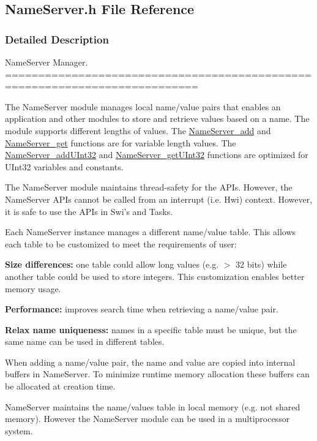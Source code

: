 \subsection{NameServer.h File Reference}
\label{_name_server_8h}


\subsubsection{Detailed Description}
NameServer Manager. ===========================================================================

The NameServer module manages local name/value pairs that enables an application and other modules to store and retrieve values based on a name. The module supports different lengths of values. The \hyperlink{_name_server_8h_ad7d45ed8fe5bcd1f10da5914c8da39f5}{NameServer\_\-add} and \hyperlink{_name_server_8h_a5f1013e57e7c5da9f003063d70a76e01}{NameServer\_\-get} functions are for variable length values. The \hyperlink{_name_server_8h_ac130195a04a34dfa2daba6ec3fff65d6}{NameServer\_\-addUInt32} and \hyperlink{_name_server_8h_ac3b6fa4f8f0ed572f1a5f6b7cb05679e}{NameServer\_\-getUInt32} functions are optimized for UInt32 variables and constants.

The NameServer module maintains thread-\/safety for the APIs. However, the NameServer APIs cannot be called from an interrupt (i.e. Hwi) context. However, it is safe to use the APIs in Swi's and Tasks.

Each NameServer instance manages a different name/value table. This allows each table to be customized to meet the requirements of user: \begin{DoxyItemize}
\item {\bfseries Size differences:} one table could allow long values (e.g. $>$ 32 bits) while another table could be used to store integers. This customization enables better memory usage. \item {\bfseries Performance:} improves search time when retrieving a name/value pair. \item {\bfseries Relax name uniqueness:} names in a specific table must be unique, but the same name can be used in different tables.\end{DoxyItemize}
When adding a name/value pair, the name and value are copied into internal buffers in NameServer. To minimize runtime memory allocation these buffers can be allocated at creation time.

NameServer maintains the name/values table in local memory (e.g. not shared memory). However the NameServer module can be used in a multiprocessor system.

